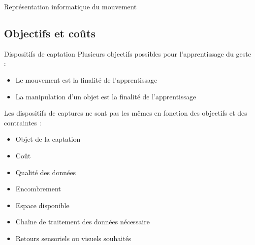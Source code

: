 \begin{frame}{Représentation informatique du mouvement}
{
        }
    \end{frame}
    
    \subsection{Objectifs et coûts}
    \begin{frame}{Dispositifs de captation}
        Plusieurs objectifs possibles pour l'apprentissage du geste :
        \begin{itemize}[label=$\bullet$]
            \item Le mouvement est la finalité de l'apprentissage
            \item La manipulation d'un objet est la finalité de l'apprentissage 
        \end{itemize}
        
        Les dispositifs de captures ne sont pas les mêmes en fonction des objectifs et des contraintes :
        \begin{itemize}[label=$\bullet$]
            \item Objet de la captation
            \item Coût
            \item Qualité des données
            \item Encombrement
            \item Espace disponible
            \item Chaîne de traitement des données nécessaire
            \item Retours sensoriels ou visuels souhaités
        \end{itemize}
    \end{frame}
    

